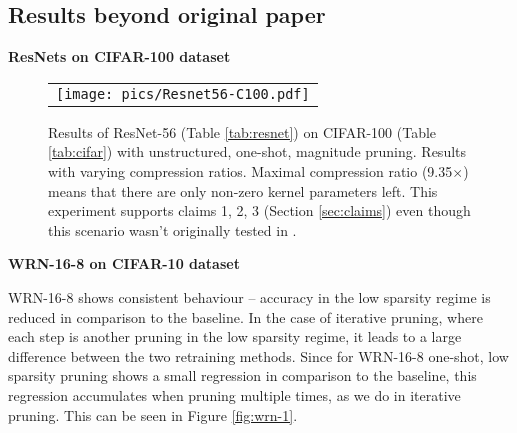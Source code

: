 

\subsection{Results beyond original paper}
 
\textbf{ResNets on CIFAR-100 dataset}
\nopagebreak
\begin{figure}[H]
\setlength{\tabcolsep}{0pt}
\centering
    \begin{tabular}{c}
      \texttt{[image: pics/Resnet56-C100.pdf]}
    \end{tabular}
\caption{Results of ResNet-56 (Table \ref{tab:resnet}) on CIFAR-100 (Table \ref{tab:cifar}) with unstructured, one-shot, magnitude pruning. Results with varying compression ratios. Maximal compression ratio (9.35$\times$) means that there are only  non-zero kernel parameters left. This experiment supports claims 1, 2, 3 (Section \ref{sec:claims}) even though this scenario wasn't originally tested in \cite{Renda}.}
\label{fig:resnet56-2}
\end{figure}

\textbf{WRN-16-8 on CIFAR-10 dataset}
\nopagebreak

WRN-16-8 shows consistent behaviour -- accuracy in the low sparsity regime is reduced in comparison to the baseline. In the case of iterative pruning, where each step is another pruning in the low sparsity regime, it leads to a large difference between the two retraining methods. Since for WRN-16-8 one-shot, low sparsity pruning shows a small regression in comparison to the baseline, this regression accumulates when pruning multiple times, as we do in iterative pruning. This can be seen in Figure \ref{fig:wrn-1}.

